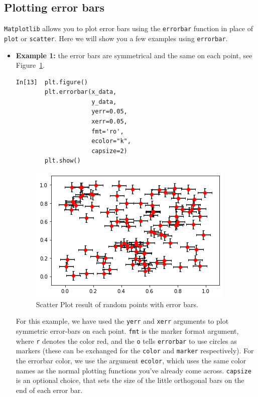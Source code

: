 \subsection{Plotting error bars}
\label{errorbar}

{\tt Matplotlib} allows you to plot error bars using the {\tt errorbar} function in place of {\tt plot} or \texttt{scatter}. Here we will show you a few examples using {\tt errorbar}.

\begin{itemize}

\item {\bf Example 1:} the error bars are symmetrical and the same on each point, see Figure~\ref{fig:peb1}.

\begin{lstlisting}[style=PY]
In[13]  plt.figure()
        plt.errorbar(x_data, 
                     y_data, 
                     yerr=0.05, 
                     xerr=0.05, 
                     fmt='ro', 
                     ecolor="k", 
                     capsize=2)
        plt.show()
\end{lstlisting}

\begin{figure}[H]
	\centering
	\includegraphics[scale=0.75]{Pictures/Week6_random_scatter_werrors.png}
\caption{Scatter Plot result of random points with error bars.}
\label{fig:peb1}
\end{figure}

For this example, we have used the \texttt{yerr} and \texttt{xerr} arguments to plot symmetric error-bars on each point. \texttt{fmt} is the marker format argument, where \texttt{r} denotes the color red, and the \texttt{o} tells \texttt{errorbar} to use circles as markers (these can be exchanged for the \texttt{color} and \texttt{marker} respectively). For the errorbar color, we use the argument \texttt{ecolor}, which uses the same color names as the normal plotting functions you've already come across. \texttt{capsize} is an optional choice, that sets the size of the little orthogonal bars on the end of each error bar.


\end{itemize}
